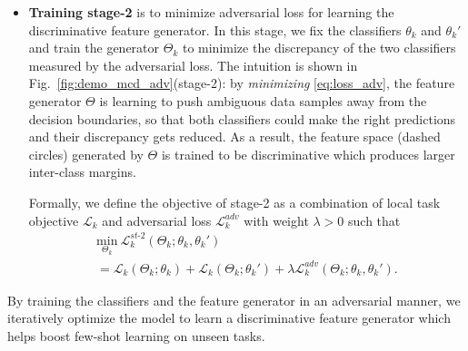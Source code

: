 \begin{itemize}[leftmargin=*]
\item \textbf{Training stage-2} is to minimize adversarial loss for learning the discriminative feature generator.
In this stage, we fix the classifiers $\theta_k$ and $\theta_k'$ and train the generator $\Theta_k$ to minimize the discrepancy of the two classifiers measured by the adversarial loss.
The intuition is shown in Fig.~\ref{fig:demo_mcd_adv}(stage-2):
by \textit{minimizing} \eqref{eq:loss_adv},  the feature generator $\Theta$ is learning to push ambiguous data samples away from the decision boundaries, so that both classifiers could make the right predictions and their discrepancy gets reduced. As a result, the feature space (dashed circles) generated by $\Theta$ is trained to be discriminative which produces larger inter-class margins.

Formally, we define the objective of stage-2 as a combination of local task objective $\mathcal{L}_k$ and adversarial loss $\mathcal{L}_k^{adv}$ with weight $\lambda>0$ such that
\begin{multline}
\underset{\Theta_k}{\text{min}}  \ \mathcal{L}_k^{st\text{-}2}(\Theta_k; \theta_k, \theta_k') \\
= \mathcal{L}_k (\Theta_k; \theta_k) +  \mathcal{L}_k (\Theta_k; \theta_k') + \lambda \mathcal{L}_k^{adv}(\Theta_k ; \theta_k, \theta_k').
\label{eq:fed_mi_adv_2}
\end{multline}
\end{itemize}







By training the classifiers and the feature generator in an adversarial manner, we iteratively optimize the model to learn a discriminative feature generator which helps boost few-shot learning on unseen tasks.

